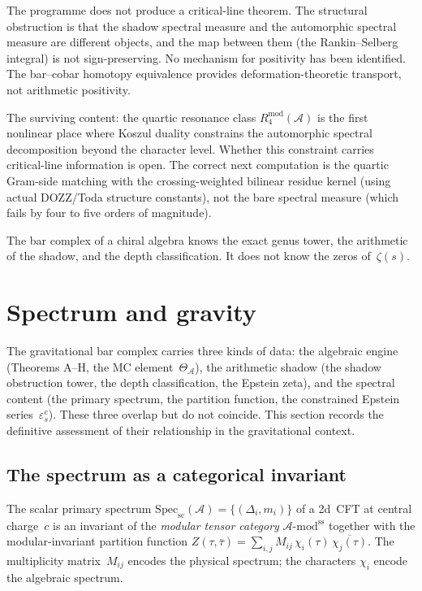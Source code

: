 \documentclass[11pt]{article}
\newcommand{\cA}{\mathcal{A}}
\begin{document}
The programme does not produce a critical-line theorem.  The
structural obstruction is that the shadow spectral measure
and the automorphic spectral measure are different objects, and
the map between them (the Rankin--Selberg integral) is not
sign-preserving.  No mechanism for positivity has been
identified.  The bar--cobar homotopy equivalence provides
deformation-theoretic transport, not arithmetic positivity.

The surviving content: the quartic resonance class
$R_4^{\mathrm{mod}}(\cA)$ is the first nonlinear place where
Koszul duality constrains the automorphic spectral decomposition
beyond the character level.  Whether this constraint carries
critical-line information is open.  The correct next computation
is the quartic Gram-side matching with the crossing-weighted
bilinear residue kernel (using actual DOZZ/Toda structure
constants), not the bare spectral measure (which fails by four
to five orders of magnitude).

The bar complex of a chiral algebra knows the exact genus tower,
the arithmetic of the shadow, and the depth classification.
It does not know the zeros of~$\zeta(s)$.


\section{Spectrum and gravity}
\label{sec:spectrum-gravity}

The gravitational bar complex carries three kinds of data:
the algebraic engine (Theorems A--H, the MC
element~$\Theta_\cA$), the arithmetic shadow (the shadow obstruction tower,
the depth classification, the Epstein zeta), and the spectral
content (the primary spectrum, the partition function, the
constrained Epstein series~$\varepsilon^c_s$).  These three
overlap but do not coincide.  This section records the definitive
assessment of their relationship in the gravitational context.

\subsection{The spectrum as a categorical invariant}

The scalar primary spectrum
$\mathrm{Spec}_{\mathrm{sc}}(\cA) = \{(\Delta_i, m_i)\}$ of a
2d~CFT at central charge~$c$ is an invariant of the
\emph{modular tensor category}
$\cA\text{-}\mathrm{mod}^{\mathrm{ss}}$ together with the
modular-invariant partition function $Z(\tau,\bar\tau)
= \sum_{i,j} M_{ij}\,\chi_i(\tau)\,\overline{\chi_j(\tau)}$.
The multiplicity matrix~$M_{ij}$ encodes the physical spectrum;
the characters $\chi_i$ encode the algebraic spectrum.
\end{document}
